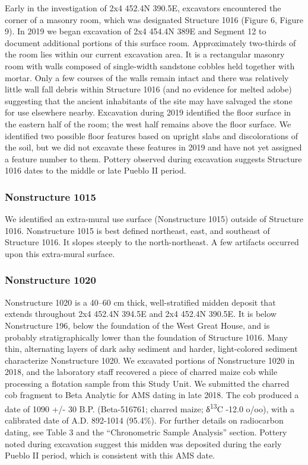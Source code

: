 \documentclass[
  12pt,
]{krantz}
\begin{document}
Early in the investigation of 2x4 452.4N 390.5E, excavators encountered
the corner of a masonry room, which was designated Structure 1016
(Figure 6, Figure 9). In 2019 we began excavation of 2x4 454.4N 389E and
Segment 12 to document additional portions of this surface room.
Approximately two-thirds of the room lies within our current excavation
area. It is a rectangular masonry room with walls composed of
single-width sandstone cobbles held together with mortar. Only a few
courses of the walls remain intact and there was relatively little wall
fall debris within Structure 1016 (and no evidence for melted adobe)
suggesting that the ancient inhabitants of the site may have salvaged
the stone for use elsewhere nearby. Excavation during 2019 identified
the floor surface in the eastern half of the room; the west half remains
above the floor surface. We identified two possible floor features based
on upright slabs and discolorations of the soil, but we did not excavate
these features in 2019 and have not yet assigned a feature number to
them. Pottery observed during excavation suggests Structure 1016 dates
to the middle or late Pueblo II period.

\hypertarget{nonstructure-1015}{%
\subsubsection{Nonstructure 1015}\label{nonstructure-1015}}

We identified an extra-mural use surface (Nonstructure 1015) outside of
Structure 1016. Nonstructure 1015 is best defined northeast, east, and
southeast of Structure 1016. It slopes steeply to the north-northeast. A
few artifacts occurred upon this extra-mural surface.

\hypertarget{nonstructure-1020}{%
\subsubsection{Nonstructure 1020}\label{nonstructure-1020}}

Nonstructure 1020 is a 40--60 cm thick, well-stratified midden deposit
that extends throughout 2x4 452.4N 394.5E and 2x4 452.4N 390.5E. It is
below Nonstructure 196, below the foundation of the West Great House,
and is probably stratigraphically lower than the foundation of Structure
1016. Many thin, alternating layers of dark ashy sediment and harder,
light-colored sediment characterize Nonstructure 1020. We excavated
portions of Nonstructure 1020 in 2018, and the laboratory staff
recovered a piece of charred maize cob while processing a flotation
sample from this Study Unit. We submitted the charred cob fragment to
Beta Analytic for AMS dating in late 2018. The cob produced a date of
1090 +/- 30 B.P. (Beta-516761; charred maize; δ\textsuperscript{13}C -12.0 o/oo), with a
calibrated date of A.D. 892-1014 (95.4\%). For further details on
radiocarbon dating, see Table 3 and the ``Chronometric Sample Analysis''
section. Pottery noted during excavation suggest this midden was
deposited during the early Pueblo II period, which is consistent with
this AMS date.
\end{document}
